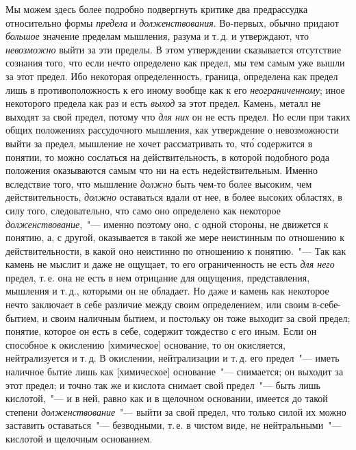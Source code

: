 Мы можем здесь более подробно подвергнуть критике
два предрассудка относительно формы \emph{предела} и \emph{долженствования}.
Во-первых, обычно придают \emph{большое} значение
пределам мышления, разума и т.\,д. и утверждают, что
\emph{невозможно} выйти за эти пределы. В этом утверждении
сказывается отсутствие сознания того, что если нечто определено
как предел, мы тем самым уже вышли за этот
предел. Ибо некоторая определенность, граница, определена
как предел лишь в противоположность к его иному вообще
как к его \emph{неограниченному}; иное некоторого предела
как раз и есть \emph{выход} за этот предел. Камень, металл
не выходят за свой предел, потому что \emph{для них} он не есть
предел. Но если при таких общих положениях рассудочного
мышления, как утверждение о невозможности выйти
за предел, мышление не хочет рассматривать то, чт\'о содержится
в понятии, то можно сослаться на действительность,
в которой подобного рода положения оказываются
самым что ни на есть недействительным. Именно вследствие
того, что мышление \emph{должно} быть чем-то более высоким,
чем действительность, \emph{должно} оставаться вдали от
нее, в более высоких областях, в силу того, следовательно,
что само оно определено как некоторое \emph{долженствование},~"---
именно поэтому оно, с одной стороны, не движется
к понятию, а, с другой, оказывается в такой же мере неистинным
по отношению к действительности, в какой оно
неистинно по отношению к понятию.~"--- Так как камень
не мыслит и даже не ощущает, то его ограниченность не
есть \emph{для него} предел, т.\,е. она не есть в нем отрицание
для ощущения, представления, мышления и т.\,д., которыми
он не обладает. Но даже и камень как некоторое нечто
заключает в себе различие между своим определением,
или своим в-себе-бытием, и своим наличным бытием,
и постольку он тоже выходит за свой предел; понятие,
которое он есть в себе, содержит тождество с его иным.
Если он способное к окислению [химическое] основание, то
он окисляется, нейтрализуется и т.\,д. В окислении, нейтрализации
и т.\,д. его предел~"--- иметь наличное бытие
лишь как [химическое] основание~"--- снимается; он выходит
за этот предел; и точно так же и кислота снимает
свой предел~"--- быть лишь кислотой,~"--- и в ней, равно как
и в щелочном основании, имеется до такой степени \emph{долженствование}~"---
выйти за свой предел, что только силой
их можно заставить оставаться~"--- безводными, т.\,е. в чистом
виде, не нейтральными~"--- кислотой и щелочным основанием.

